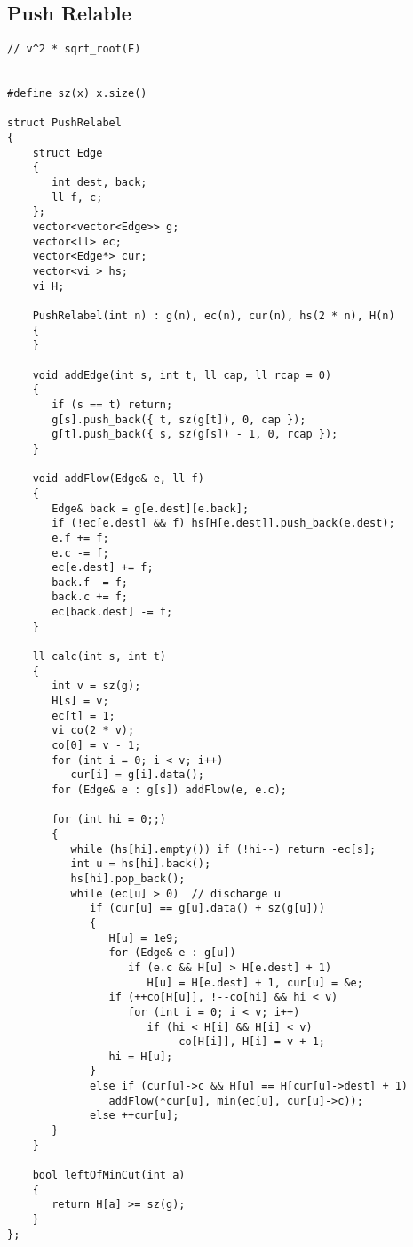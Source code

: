 \documentclass{article}
\begin{document}
\subsection{Push Relable}
\begin{verbatim}
// v^2 * sqrt_root(E)


#define sz(x) x.size()  
  
struct PushRelabel  
{  
    struct Edge  
    {  
       int dest, back;  
       ll f, c;  
    };  
    vector<vector<Edge>> g;  
    vector<ll> ec;  
    vector<Edge*> cur;  
    vector<vi > hs;  
    vi H;  
  
    PushRelabel(int n) : g(n), ec(n), cur(n), hs(2 * n), H(n)  
    {  
    }  
  
    void addEdge(int s, int t, ll cap, ll rcap = 0)  
    {  
       if (s == t) return;  
       g[s].push_back({ t, sz(g[t]), 0, cap });  
       g[t].push_back({ s, sz(g[s]) - 1, 0, rcap });  
    }  
  
    void addFlow(Edge& e, ll f)  
    {  
       Edge& back = g[e.dest][e.back];  
       if (!ec[e.dest] && f) hs[H[e.dest]].push_back(e.dest);  
       e.f += f;  
       e.c -= f;  
       ec[e.dest] += f;  
       back.f -= f;  
       back.c += f;  
       ec[back.dest] -= f;  
    }  
  
    ll calc(int s, int t)  
    {  
       int v = sz(g);  
       H[s] = v;  
       ec[t] = 1;  
       vi co(2 * v);  
       co[0] = v - 1;  
       for (int i = 0; i < v; i++)  
          cur[i] = g[i].data();  
       for (Edge& e : g[s]) addFlow(e, e.c);  
  
       for (int hi = 0;;)  
       {  
          while (hs[hi].empty()) if (!hi--) return -ec[s];  
          int u = hs[hi].back();  
          hs[hi].pop_back();  
          while (ec[u] > 0)  // discharge u    
			 if (cur[u] == g[u].data() + sz(g[u]))
             {  
                H[u] = 1e9;  
                for (Edge& e : g[u])  
                   if (e.c && H[u] > H[e.dest] + 1)  
                      H[u] = H[e.dest] + 1, cur[u] = &e;  
                if (++co[H[u]], !--co[hi] && hi < v)  
                   for (int i = 0; i < v; i++)  
                      if (hi < H[i] && H[i] < v)  
                         --co[H[i]], H[i] = v + 1;  
                hi = H[u];  
             }  
             else if (cur[u]->c && H[u] == H[cur[u]->dest] + 1)  
                addFlow(*cur[u], min(ec[u], cur[u]->c));  
             else ++cur[u];  
       }  
    }  
  
    bool leftOfMinCut(int a)  
    {  
       return H[a] >= sz(g);  
    }  
};
\end{verbatim}
\end{document}
